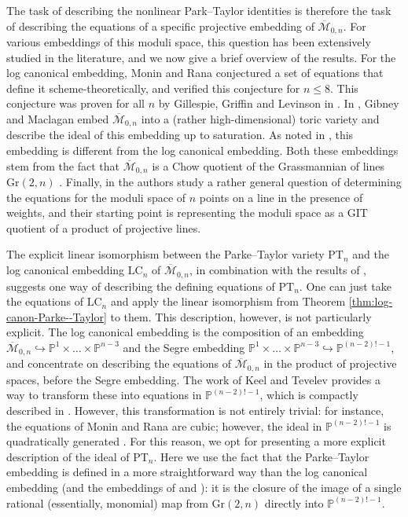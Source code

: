\documentclass[12pt, reqno]{amsart}
\numberwithin{equation}{section}
\theoremstyle{plain}
\theoremstyle{definition}
\newcommand{\monbar}{\overline{\mathcal{M}}_{0, n}}
\begin{document}
The task of describing the nonlinear Park--Taylor identities is therefore the task of describing the equations of a specific projective embedding of $\monbar$. 
For various embeddings of this moduli space, this question has been extensively studied in the literature, and we now give a brief overview of the results.
For the log canonical embedding, Monin and Rana \cite{monin2017equations} conjectured a set of equations that define it scheme-theoretically, and verified this conjecture for $n\leq 8$.
This conjecture was proven for all $n$ by Gillespie, Griffin and Levinson in \cite{gillespie2022proof}. 
In \cite{maclagan2010chow}, Gibney and Maclagan embed $\monbar$ into a (rather high-dimensional) toric variety and describe the ideal of this embedding up to saturation. 
As noted in \cite[Section 1]{monin2017equations}, this embedding is different from the log canonical embedding. 
Both these embeddings stem from the fact that $\monbar$ is a Chow quotient of the Grassmannian of lines $\mathrm{Gr}(2,n)$ \cite{kapranov1993chow}. 
Finally, in \cite{vakil2009equations} the authors study a rather general question of determining the equations for the moduli space of $n$ points on a line in the presence of weights, and their starting point is representing the moduli space as a GIT quotient of a product of projective lines.

The explicit linear isomorphism between the Parke--Taylor variety $\mathrm{PT}_n$ and the log canonical embedding $\mathrm{LC}_n$ of $\monbar$, in combination with the results of \cite{monin2017equations, gillespie2022proof}, suggests one way of describing the defining equations of $\mathrm{PT}_n$. One can just take the equations of $\mathrm{LC}_n$ and apply the linear isomorphism from Theorem \ref{thm:log-canon-Parke--Taylor} to them. This description, however, is not particularly explicit. The log canonical embedding is the composition of an embedding $\monbar \hookrightarrow \mathbb{P}^1\times\ldots\times\mathbb{P}^{n-3}$ and the Segre embedding $\mathbb{P}^1\times\ldots\times\mathbb{P}^{n-3}\hookrightarrow \mathbb{P}^{(n-2)!-1}$, and \cite{monin2017equations, gillespie2022proof} concentrate on describing the equations of $\monbar$ in the product of projective spaces, before the Segre embedding. The work of Keel and Tevelev \cite{keel2009equations} provides a way to transform these into equations in $\mathbb{P}^{(n-2)!-1}$, which is compactly described in \cite[Section 1]{monin2017equations}. However, this transformation is not entirely trivial: for instance, the equations of Monin and Rana are cubic; however, the ideal in $\mathbb{P}^{(n-2)!-1}$ is quadratically generated \cite[Theorem 8.6]{keel2009equations}. For this reason, we opt for presenting a more explicit description of the ideal of $\mathrm{PT}_n$. Here we use the fact that the Parke--Taylor embedding is defined in a more straightforward way than the log canonical embedding (and the embeddings of \cite{maclagan2010chow} and \cite{vakil2009equations}): it is the closure of the image of a single rational (essentially, monomial) map from $\mathrm{Gr}(2,n)$ directly into $\mathbb{P}^{(n-2)!-1}$.
\end{document}
